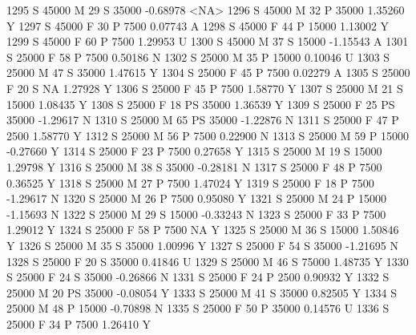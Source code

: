 \documentclass{article}
\begin{document}
\begin{Schunk}
\begin{Soutput}
1295      S      45000   M  29         S  35000  -0.68978 <NA>
1296      S      45000   M  32         P  35000   1.35260    Y
1297      S      45000   F  30         P   7500   0.07743    A
1298      S      45000   F  44         P  15000   1.13002    Y
1299      S      45000   F  60         P   7500   1.29953    U
1300      S      45000   M  37         S  15000  -1.15543    A
1301      S      25000   F  58         P   7500   0.50186    N
1302      S      25000   M  35         P  15000   0.10046    U
1303      S      25000   M  47         S  35000   1.47615    Y
1304      S      25000   F  45         P   7500   0.02279    A
1305      S      25000   F  20         S     NA   1.27928    Y
1306      S      25000   F  45         P   7500   1.58770    Y
1307      S      25000   M  21         S  15000   1.08435    Y
1308      S      25000   F  18        PS  35000   1.36539    Y
1309      S      25000   F  25        PS  35000  -1.29617    N
1310      S      25000   M  65        PS  35000  -1.22876    N
1311      S      25000   F  47         P   2500   1.58770    Y
1312      S      25000   M  56         P   7500   0.22900    N
1313      S      25000   M  59         P  15000  -0.27660    Y
1314      S      25000   F  23         P   7500   0.27658    Y
1315      S      25000   M  19         S  15000   1.29798    Y
1316      S      25000   M  38         S  35000  -0.28181    N
1317      S      25000   F  48         P   7500   0.36525    Y
1318      S      25000   M  27         P   7500   1.47024    Y
1319      S      25000   F  18         P   7500  -1.29617    N
1320      S      25000   M  26         P   7500   0.95080    Y
1321      S      25000   M  24         P  15000  -1.15693    N
1322      S      25000   M  29         S  15000  -0.33243    N
1323      S      25000   F  33         P   7500   1.29012    Y
1324      S      25000   F  58         P   7500        NA    Y
1325      S      25000   M  36         S  15000   1.50846    Y
1326      S      25000   M  35         S  35000   1.00996    Y
1327      S      25000   F  54         S  35000  -1.21695    N
1328      S      25000   F  20         S  35000   0.41846    U
1329      S      25000   M  46         S  75000   1.48735    Y
1330      S      25000   F  24         S  35000  -0.26866    N
1331      S      25000   F  24         P   2500   0.90932    Y
1332      S      25000   M  20        PS  35000  -0.08054    Y
1333      S      25000   M  41         S  35000   0.82505    Y
1334      S      25000   M  48         P  15000  -0.70898    N
1335      S      25000   F  50         P  35000   0.14576    U
1336      S      25000   F  34         P   7500   1.26410    Y

\end{Soutput}
\end{Schunk}
\end{document}
